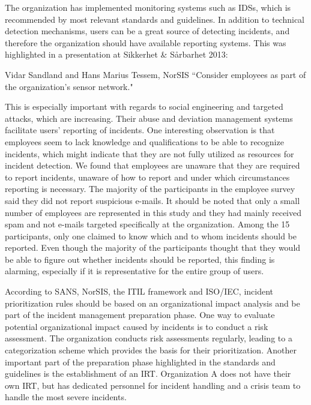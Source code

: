 The organization has implemented monitoring systems such as IDSs, which is recommended by most relevant standards and guidelines. In addition to technical detection mechanisms, users can be a great source of detecting incidents, and therefore the organization should have available reporting systems. This was highlighted in a presentation at Sikkerhet \& S\aa rbarhet 2013:

\begin{newquote}{Vidar Sandland and Hans Marius Tessem, NorSIS}
``Consider employees as part of the organization's sensor network."
\end{newquote}

This is especially important with regards to social engineering and targeted attacks, which are increasing. Their abuse and deviation management systems facilitate users' reporting of incidents. One interesting observation is that employees seem to lack knowledge and qualifications to be able to recognize incidents, which might indicate that they are not fully utilized as resources for incident detection. We found that employees are unaware that they are required to report incidents, unaware of how to report and under which circumstances reporting is necessary. The majority of the participants in the employee survey said they did not report suspicious e-mails. It should be noted that only a small number of employees are represented in this study and they had mainly received spam and not e-mails targeted specifically at the organization. Among the 15 participants, only one claimed to know which and to whom incidents should be reported. Even though the majority of the participants thought that they would be able to figure out whether incidents should be reported, this finding is alarming, especially if it is representative for the entire group of users. 

According to SANS, NorSIS, the ITIL framework and ISO/IEC, incident prioritization rules should be based on an organizational impact analysis and be part of the incident management preparation phase. One way to evaluate potential organizational impact caused by incidents is to conduct a risk assessment. The organization conducts risk assessments regularly, leading to a categorization scheme which provides the basis for their prioritization. Another important part of the preparation phase highlighted in the standards and guidelines is the establishment of an \ac{IRT}. Organization A does not have their own \ac{IRT}, but has dedicated personnel for incident handling and a crisis team to handle the most severe incidents.

